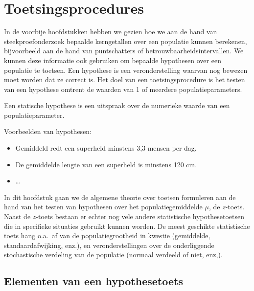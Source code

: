 \chapter{Toetsingsprocedures}
\label{ch:toetsingsprocedures}

In de voorbije hoofdstukken hebben we gezien hoe we aan de hand van steekproefonderzoek bepaalde kerngetallen over een populatie kunnen berekenen, bijvoorbeeld aan de hand van puntschatters of betrouwbaarheidsintervallen. We kunnen deze informatie ook gebruiken om bepaalde hypothesen over een populatie te toetsen. Een hypothese is een veronderstelling waarvan nog bewezen moet worden dat ze correct is. Het doel van een toetsingsprocedure is het testen van een hypothese omtrent de waarden van 1 of meerdere populatieparameters.

\begin{definition}
  Een statische hypothese is een uitspraak over de numerieke waarde van een populatieparameter.
\end{definition}

Voorbeelden van hypothesen:

\begin{itemize}
  \item Gemiddeld redt een superheld minstens 3,3 mensen per dag.
  \item De gemiddelde lengte van een superheld is minstens 120 cm.
  \item \dots
\end{itemize}

In dit hoofdstuk gaan we de algemene theorie over toetsen formuleren aan de hand van het testen van hypothesen over het populatiegemiddelde $\mu$, de $z$-toets. Naast de $z$-toets bestaan er echter nog vele andere statistische hypothesetoetsen die in specifieke situaties gebruikt kunnen worden. De meest geschikte statistische toets hang o.a.~af van de populatiegrootheid in kwestie (gemiddelde, standaardafwijking, enz.), en veronderstellingen over de onderliggende stochastische verdeling van de populatie (normaal verdeeld of niet, enz,).

\section{Elementen van een hypothesetoets}
\label{sec:elementen-hypothesetoets}

